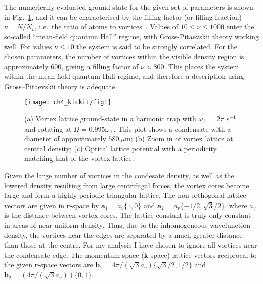 The numerically evaluated ground-state for the given set of parameters is shown in Fig.~\ref{fig:vlatt_gnd}, and it can be characterised by the filling factor (or filling fraction) $\nu=N/N_v$, i.e.~the ratio of atoms to vortices~\cite{BEC:Fetter_revmodphys_2009}. Values of $10 \leq \nu \leq 1000$ enter the so-called ``mean-field quantum Hall'' regime, with Gross-Pitaevskii theory working well. For values $\nu \leq 10$ the system is said to be strongly correlated. For the chosen parameters, the number of vortices within the visible density region is approximately 600, giving a filling factor of $\nu \approx 800 $. This places the system within the mean-field quantum Hall regime, and therefore a description using Gross--Pitaevskii theory is adequate~\cite{Vtx:Schweikhard_prl_2004}

\begin{figure}[tb]
    \centering
    \texttt{[image: ch4\_kickit/fig1]}
    \caption{(a) Vortex lattice ground-state in a harmonic trap with $\omega_\perp=2\pi$ s$^{-1}$ and rotating at $\Omega=0.995\omega_\perp$. This plot shows a condensate with a diameter of approximately $580~\mu\textrm{m}$; (b) Zoom in of vortex lattice at central density; (c) Optical lattice potential with a periodicity matching that of the vortex lattice.}
    \label{fig:vlatt_gnd}
\end{figure}

Given the large number of vortices in the condesate density, as well as the lowered density resulting from large centrifugal forces, the vortex cores become large and form a highly periodic triangular lattice. The non-orthogonal lattice vectors are given in $\mathbf{r}$-space by $\mathbf{a}_1 = a_v\{1,0\}$ and $\mathbf{a}_2 = a_v\{-1/2, \sqrt{3}/2\}$, where $a_v$ is the distance between vortex cores. The lattice constant is truly only constant in areas of near uniform density. Thus, due to the inhomogeneous wavefunction density, the vortices near the edges are separated by a much greater distance than those at the centre. For my analysis I have chosen to ignore all vortices near the condensate edge. The momentum space ($\mathbf{k}$-space) lattice vectors reciprocal to the given $\mathbf{r}$-space vectors are $\mathbf{b}_1 = 4\pi/(\sqrt{3}a_v)\{\sqrt{3}/2,1/2\}$ and $\mathbf{b}_2 = (4\pi/(\sqrt{3}a_v))\{0,1\}$.

